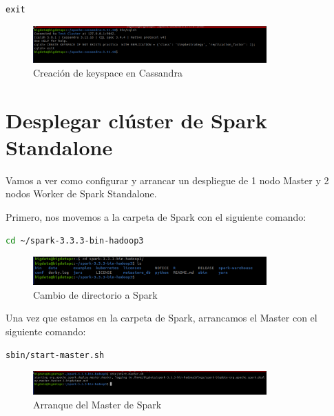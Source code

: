 \begin{lstlisting}[language=sql]
    exit
\end{lstlisting}

\begin{figure}[H]
    \centering
    \includegraphics[width=0.8\textwidth]{figures/13.png}
    \caption{Creación de keyspace en Cassandra}
\end{figure}

\section{Desplegar clúster de Spark Standalone}

Vamos a ver como configurar y arrancar un despliegue de 1 nodo Master y 2 nodos Worker de Spark Standalone.

Primero, nos movemos a la carpeta de Spark con el siguiente comando:

\begin{lstlisting}[language=bash]
    cd ~/spark-3.3.3-bin-hadoop3
\end{lstlisting}

\begin{figure}[H]
    \centering
    \includegraphics[width=0.8\textwidth]{figures/14.png}
    \caption{Cambio de directorio a Spark}
\end{figure}

Una vez que estamos en la carpeta de Spark, arrancamos el Master con el siguiente comando:

\begin{lstlisting}[language=bash]
    sbin/start-master.sh
\end{lstlisting}

\begin{figure}[H]
    \centering
    \includegraphics[width=0.8\textwidth]{figures/15.png}
    \caption{Arranque del Master de Spark}
\end{figure}

